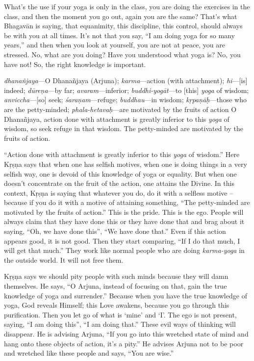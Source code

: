 What’s the use if your yoga is only in the class, you are doing the exercises in the class, and then the moment you go out, again you are the same? That’s what Bhagavān is saying, that equanimity, this discipline, this control, should always be with you at all times. It’s not that you say, “I am doing yoga for so many years,” and then when you look at yourself, you are not at peace, you are stressed. No, what are you doing? Have you understood what yoga is? No, you have not! So, the right knowledge is important.


{%
  \textit{dhanañjaya}---O Dhanañjaya (Arjuna); 
  \textit{karma}---action (with attachment); 
  \textit{hi}---[is] indeed; 
  \textit{dūreṇa}---by far; 
  \textit{avaram}---inferior; 
  \textit{buddhi-yogāt}---to [this] \textit{yoga} of wisdom; 
  \textit{anviccha}---[so] seek; 
  \textit{śaraṇam}---refuge; 
  \textit{buddhau}---in wisdom; 
  \textit{kṛpaṇāḥ}---those who are the petty-minded; 
  \textit{phala-hetavaḥ}---are motivated by the fruits of action
}
{%
  O Dhanañjaya, action done with attachment is greatly inferior to this \textit{yoga} of wisdom, so seek refuge in that wisdom. The petty-minded are motivated by the fruits of action.
}

“Action done with attachment is greatly inferior to this \textit{yoga} of wisdom.” Here Kṛṣṇa says that when one has selfish motives, when one is doing things in a very selfish way, one is devoid of this knowledge of yoga or equality. But when one doesn’t concentrate on the fruit of the action, one attains the Divine. In this context, Kṛṣṇa is saying that whatever you do, do it with a selfless motive -- because if you do it with a motive of attaining something, “The petty-minded are motivated by the fruits of action.” This is the pride. This is the ego. People will always claim that they have done this or they have done that and brag about it saying, “Oh, we have done this”, “We have done that.” Even if this action appears good, it is not good. Then they start comparing, “If I do that much, I will get that much.” They work like normal people who are doing \textit{karma-yoga} in the outside world. It will not free them.

Kṛṣṇa says we should pity people with such minds because they will damn themselves. He says, “O Arjuna, instead of focusing on that, gain the true knowledge of yoga and surrender.” Because when you have the true knowledge of yoga, God reveals Himself; this Love awakens, because you go through this purification. Then you let go of what is ‘mine’ and ‘I’. The ego is not present, saying, “I am doing this”, “I am doing that.” These evil ways of thinking will disappear. He is advising Arjuna, “If you go into this wretched state of mind and hang onto these objects of action, it’s a pity.” He advises Arjuna not to be poor and wretched like these people and says, “You are wise.”

